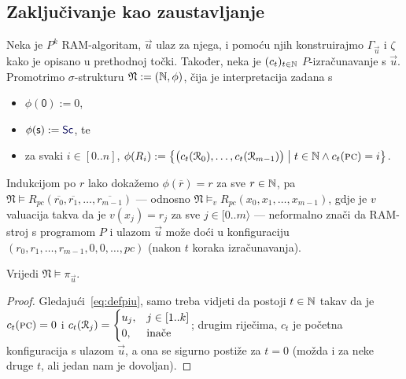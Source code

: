 \subsection{Zaključivanje kao zaustavljanje}

Neka je $P^k$ RAM-algoritam, $\vec u$ ulaz za njega, i pomoću njih konstruirajmo $\Gamma_{\vec u}$ i $\zeta$ kako je opisano u prethodnoj točki.
Također, neka je $(c_t)_{t\in{\mathbb N}}$ $P$-izračunavanje s $\vec u$. Promotrimo $\sigma$-strukturu $\mathfrak N:=({\mathbb N},\phi)$, čija je interpretacija zadana s
\begin{itemize}
    \item $\phi(\mathsf0):=0$,
    \item $\phi(\mathsf s):=\f{Sc}$, te
    \item za svaki $i\in[0..n]$,
    $
        \phi(R_i):=\bigl\{
        \bigl(c_t(\mathcal R_{0}),\dotsc,c_t(\mathcal R_{m-1})\bigr)
        \bigm|
        t\in{\mathbb N}\land c_t(\textsc{pc})=i
        \bigr\}
    $.
\end{itemize}
Indukcijom po $r$ lako dokažemo $\phi(\overline r)=r$ za sve $r\in{\mathbb N}$, pa $\mathfrak N\models R_{pc}(\overline{r_0},\overline{r_1},\dotsc,\overline{r_{m-1}})$ --- odnosno $\mathfrak N\models_v R_{pc}(x_0,x_1,\dotsc,x_{m-1})$, gdje je $v$ valuacija takva da je $v(x_j)=r_j$ za sve $j\in[0..m\rangle$ --- neformalno znači da RAM-stroj s programom $P$ i ulazom $\vec u$ može doći u konfiguraciju $(r_0,r_1,\dotsc,r_{m-1},0,0,\dotsc,pc)$ (nakon $t$ koraka izračunavanja). 

\begin{lema}[{name=[istinitost početne formule u $\mathfrak N$]}]\label{lm:Npiu}
Vrijedi $\mathfrak N\models\pi_{\vec u}$.
\end{lema}
\begin{proof}
Gledajući~\eqref{eq:defpiu}, samo treba vidjeti da postoji $t\in{\mathbb N}$ takav da je $c_t(\textsc{pc})=0$ i $c_t(\mathcal R_{j})=\begin{cases}
u_j,&j\in[1..k]\\
0,&\text{inače}
\end{cases}$; drugim riječima, $c_t$ je početna konfiguracija s ulazom $\vec u$, a ona se sigurno postiže za $t=0$ (možda i za neke druge $t$, ali jedan nam je dovoljan).
\end{proof}

